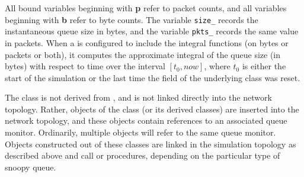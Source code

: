 All bound variables beginning with {\bf p} refer to packet counts, and
all variables beginning with {\bf b} refer to byte counts.
The variable {\tt size\_} records the instantaneous queue size in bytes,
and the variable {\tt pkts\_} records the same value in packets.
When a  is configured to include the integral
functions (on bytes or packets or both), it
computes the approximate integral of the
queue size (in bytes)
with respect to time over the interval $[t_0, now]$, where
$t_0$ is either the start of the simulation or the last time the
 field of the underlying  class was reset.

The  class is not derived from , and
is not linked directly into the network topology.
Rather, objects of the  class (or its derived classes)
are inserted into the network topology, and these objects contain references
to an associated queue monitor.
Ordinarily, multiple  objects will refer to the same
queue monitor.
Objects constructed out of these classes are linked in the simulation
topology as described above and call 
 or  procedures,
depending on the particular type of snoopy queue.
